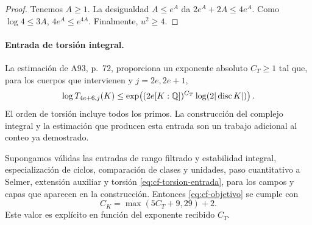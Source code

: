 \begin{proof}
Tenemos $A\ge1$. La desigualdad $A\le e^A$ da
$2e^A+2A\le4e^A$. Como $\log4\le3A$,
$4e^A\le e^{4A}$. Finalmente, $u^2\ge4$.
\end{proof}

\paragraph{Entrada de torsión integral.}
La estimación de A93, p.~72, proporciona un exponente absoluto
$C_T\ge1$ tal que, para los cuerpos que intervienen y
$j=2e,2e+1$,
\begin{equation}
 \log T_{4e+6,j}(K)
 \le\exp\!\left((2e[K:\mathbb{Q}])^{C_T}
             \log(2|\operatorname{disc}K|)\right).
 \label{eq:cf-torsion-entrada}
\end{equation}
El orden de torsión incluye todos los primos. La construcción
del complejo integral y la estimación que producen esta entrada
son un trabajo adicional al conteo ya demostrado.

\begin{teorema}
\label{thm:cf-capa-fija}
Supongamos válidas las entradas de rango filtrado y estabilidad
integral, especialización de ciclos, comparación de clases y
unidades, paso cuantitativo a Selmer, extensión auxiliar y
torsión \eqref{eq:cf-torsion-entrada}, para los campos y capas
que aparecen en la construcción.
Entonces \eqref{eq:cf-objetivo} se cumple con
\begin{equation}
 C_K=\max(5C_T+9,29)+2.
 \label{eq:cf-exponente}
\end{equation}
Este valor es explícito en función del exponente recibido $C_T$.
\end{teorema}

